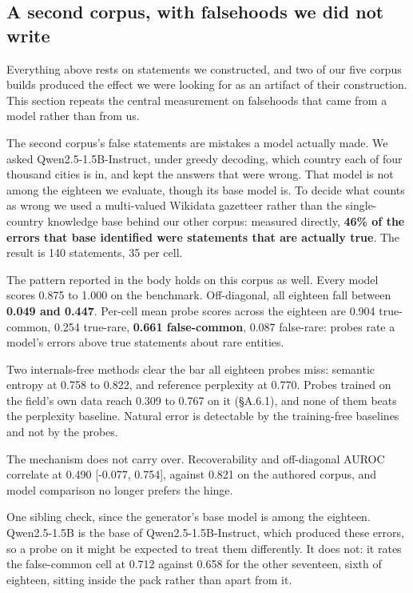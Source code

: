 \documentclass[10pt]{article}
\begin{document}
\subsection{A second corpus, with falsehoods we did not write}

Everything above rests on statements we constructed, and two of our five corpus builds produced the effect we were looking for as an artifact of their construction. This section repeats the central measurement on falsehoods that came from a model rather than from us.

The second corpus's false statements are mistakes a model actually made. We asked Qwen2.5-1.5B-Instruct, under greedy decoding, which country each of four thousand cities is in, and kept the answers that were wrong. That model is not among the eighteen we evaluate, though its base model is. To decide what counts as wrong we used a multi-valued Wikidata gazetteer rather than the single-country knowledge base behind our other corpus: measured directly, \textbf{46\% of the errors that base identified were statements that are actually true}. The result is 140 statements, 35 per cell.

The pattern reported in the body holds on this corpus as well. Every model scores 0.875 to 1.000 on the benchmark. Off-diagonal, all eighteen fall between \textbf{0.049 and 0.447}. Per-cell mean probe scores across the eighteen are 0.904 true-common, 0.254 true-rare, \textbf{0.661 false-common}, 0.087 false-rare: probes rate a model's errors above true statements about rare entities.

Two internals-free methods clear the bar all eighteen probes miss: semantic entropy at 0.758 to 0.822, and reference perplexity at 0.770. Probes trained on the field's own data reach 0.309 to 0.767 on it (§A.6.1), and none of them beats the perplexity baseline. Natural error is detectable by the training-free baselines and not by the probes.

The mechanism does not carry over. Recoverability and off-diagonal AUROC correlate at 0.490 [-0.077, 0.754], against 0.821 on the authored corpus, and model comparison no longer prefers the hinge.

One sibling check, since the generator's base model is among the eighteen. Qwen2.5-1.5B is the base of Qwen2.5-1.5B-Instruct, which produced these errors, so a probe on it might be expected to treat them differently. It does not: it rates the false-common cell at 0.712 against 0.658 for the other seventeen, sixth of eighteen, sitting inside the pack rather than apart from it.
\end{document}
